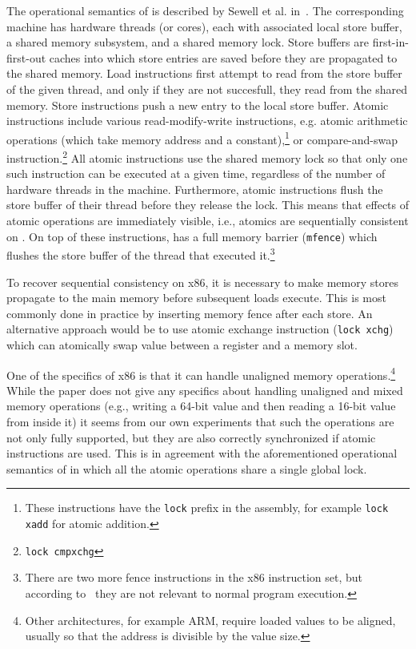 The operational semantics of \xtso is described by Sewell et al. in~\cite{x86tso}.
The corresponding machine has hardware threads (or cores), each with associated local store buffer, a shared memory subsystem, and a shared memory lock.
Store buffers are first-in-first-out caches into which store entries are saved before they are propagated to the shared memory.
Load instructions first attempt to read from the store buffer of the given
thread, and only if they are not succesfull, they read from the shared memory.
Store instructions push a new entry to the local store buffer.
Atomic instructions include various read-modify-write instructions, e.g. atomic
arithmetic operations (which take memory address and a constant),\footnote{These
  instructions have the \texttt{lock} prefix in the assembly, for example
  \texttt{lock xadd} for atomic addition.}
or compare-and-swap instruction.\footnote{\texttt{lock cmpxchg}}
All atomic instructions use the shared memory lock so that only one such instruction can be executed at a given time, regardless of the number of hardware threads in the machine.
Furthermore, atomic instructions flush the store buffer of their thread before they release the lock.
This means that effects of atomic operations are immediately visible, i.e., atomics are sequentially consistent on \xtso.
On top of these instructions, \xtso has a full memory barrier (\texttt{mfence}) which flushes the store buffer of the thread that executed it.\footnote{There are two more fence instructions in the x86 instruction set, but according to~\cite{x86tso} they are not relevant to normal program execution.}

To recover sequential consistency on x86, it is necessary to make memory stores propagate to the main memory before subsequent loads execute.
This is most commonly done in practice by inserting memory fence after each store.
An alternative approach would be to use atomic exchange instruction
(\texttt{lock xchg}) which can atomically swap value between a register and a
memory slot.

One of the specifics of x86 is that it can handle unaligned memory operations.\footnote{Other architectures, for example ARM, require loaded values to be aligned, usually so that the address is divisible by the value size.}
While the \xtso paper does not give any specifics about handling unaligned and
mixed memory operations (e.g., writing a 64-bit value and then reading a 16-bit
value from inside it) it seems from our own experiments that such the operations
are not only fully supported, but they are also correctly synchronized if atomic instructions are used.
This is in agreement with the aforementioned operational semantics of \xtso in
which all the atomic operations share a single global lock.

